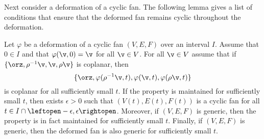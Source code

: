 Next consider a deformation of a cyclic fan.  The following lemma
gives a list of conditions that ensure that the deformed fan remains
cyclic throughout the deformation.


\begin{lemma}\label{lemma:fan-open}
Let $\varphi$ be a deformation of a cyclic fan $(V,E,F)$ over an
interval $I$.  Assume that $0\in I$ and that $\varphi(\v,0)=\v$ for
all $\v\in V$.  For all $\v\in V$ assume that if
$\{\orz,\rho^{-1}\v,\v,\rho\v\}$ is coplanar, then
\begin{displaymath}
\{\orz,\varphi(\rho^{-1}\v,t),\varphi(\v,t),\varphi(\rho\v,t)\}
\end{displaymath} is coplanar for all sufficiently small $t$.
If the property  is maintained for sufficiently small $t$,
then exists $\epsilon>0$ such that $(V(t),E(t),F(t))$ is a cyclic fan
for all $t\in I\cap \leftopen-\epsilon,\epsilon\rightopen$.  Moreover,
if $(V,E,F)$ is generic, then the property  is in fact
maintained for sufficiently small $t$.  Finally, if $(V,E,F)$ is
generic, then the deformed fan is also generic for sufficiently small
$t$.
\end{lemma}

